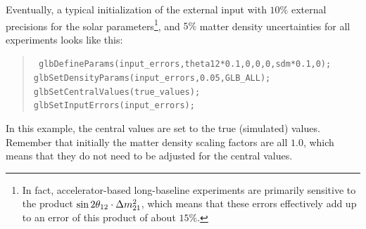 Eventually, a typical initialization of the external input with
$10\%$ external precisions for the solar 
parameters\footnote{In fact, accelerator-based long-baseline experiments 
are primarily sensitive to the product $\sin 2 \theta_{12} \cdot \Delta m_{21}^2$, 
which means that these errors effectively add up to an error of this 
product of about $15\%$.}, 
and $5\%$ matter density uncertainties for all experiments looks like this:
\begin{quote}
{\tt
 glbDefineParams(input\_errors,theta12*0.1,0,0,0,sdm*0.1,0);\\  
 glbSetDensityParams(input\_errors,0.05,GLB\_ALL);\\
 glbSetCentralValues(true\_values);\\
 glbSetInputErrors(input\_errors);\\
}
\end{quote}
In this example, the central values are set to 
the true (simulated) values. Remember that initially the 
matter density scaling factors are 
all $1.0$, which means that they do not need to be adjusted for the
central values.

